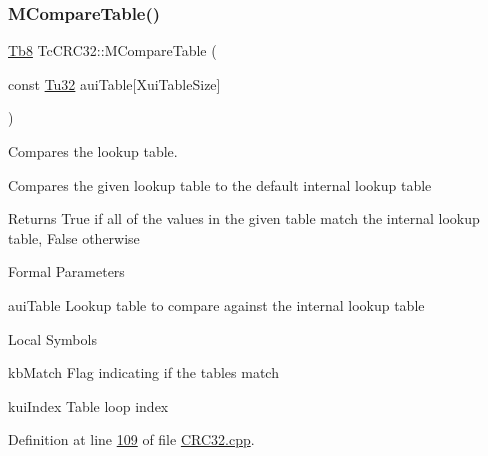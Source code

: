 \subsubsection{\texorpdfstring{M\+Compare\+Table()}{MCompareTable()}}
{\footnotesize\ttfamily \mbox{\hyperlink{namespace_g_n_common_a8115dc7ed53b6e5b52e6bfde1632ea74}{Tb8}} Tc\+C\+R\+C32\+::\+M\+Compare\+Table (\begin{DoxyParamCaption}\item[{const \mbox{\hyperlink{namespace_g_n_common_a941b527ef318f318aed7903dc832b7e4}{Tu32}}}]{aui\+Table\mbox{[}\+Xui\+Table\+Size\mbox{]} }\end{DoxyParamCaption})}



Compares the lookup table. 

Compares the given lookup table to the default internal lookup table

\begin{DoxyReturn}{Returns}
True if all of the values in the given table match the internal lookup table, False otherwise
\end{DoxyReturn}
\begin{DoxyParagraph}{Formal Parameters}

\begin{DoxyPre}{\ttfamily [ in ]  auiTable    Lookup table to compare against the internal lookup table }\end{DoxyPre}

\end{DoxyParagraph}
\begin{DoxyParagraph}{Local Symbols}

\begin{DoxyPre}{\ttfamily  kbMatch     Flag indicating if the tables match }\end{DoxyPre}
 
\begin{DoxyPre}{\ttfamily  kuiIndex    Table loop index }\end{DoxyPre}
 
\end{DoxyParagraph}


Definition at line \mbox{\hyperlink{_c_r_c32_8cpp_source_l00109}{109}} of file \mbox{\hyperlink{_c_r_c32_8cpp_source}{C\+R\+C32.\+cpp}}.

\mbox{\label{class_g_n_common_1_1_n_data_authentication_1_1_tc_c_r_c32_a11a20f9425a6431b0f2eb72e126a3a0e}} 
